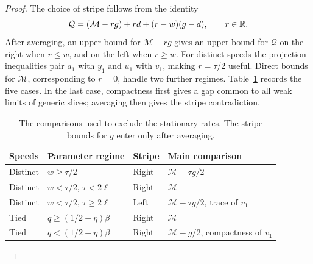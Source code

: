 \begin{proof}
The choice of stripe follows from the identity
\[
 \mathcal Q=(\mathcal M-rg)+rd+(r-w)(g-d),
 \qquad r\in\mathbb R.
\]
After averaging, an upper bound for \(\mathcal M-rg\) gives an upper bound
for \(\mathcal Q\) on the right when \(r\le w\), and on the left
when \(r\ge w\).  For distinct speeds the projection inequalities
pair \(a_1\) with \(y_1\) and \(u_1\) with \(v_1\), making
\(r=\tau/2\) useful.  Direct bounds for \(\mathcal M\), corresponding
to \(r=0\), handle two further regimes.  Table~\ref{tab:closure-cases}
records the five cases.  In the last case, compactness first gives a
gap common to all weak limits of generic slices; averaging then gives
the stripe contradiction.

\begin{table}[htbp]
\centering
\small
\begin{tabular}{@{}llll@{}}
\toprule
Speeds & Parameter regime & Stripe & Main comparison\\
\midrule
Distinct & $w\ge\tau/2$ & Right & $\mathcal M-\tau g/2$\\
Distinct & $w<\tau/2$, $\tau<2\ell$ & Right & $\mathcal M$\\
Distinct & $w<\tau/2$, $\tau\ge2\ell$ & Left
 & $\mathcal M-\tau g/2$, trace of $v_1$\\
Tied & $q\ge(1/2-\eta)\beta$ & Right & $\mathcal M$\\
Tied & $q<(1/2-\eta)\beta$ & Right
 & $\mathcal M-g/2$, compactness of $v_1$\\
\bottomrule
\end{tabular}
\caption{The comparisons used to exclude the stationary rates.
The stripe bounds for $g$ enter only after averaging.}
\label{tab:closure-cases}
\end{table}


\end{proof}
